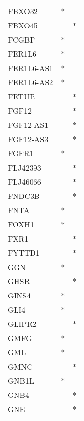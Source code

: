 \begin{longtable}{lcc}
FBXO32           &              * &            \\
FBXO45           &                &          * \\
FCGBP            &              * &            \\
FER1L6           &              * &            \\
FER1L6-AS1       &              * &            \\
FER1L6-AS2       &              * &            \\
FETUB            &                &          * \\
FGF12            &                &          * \\
FGF12-AS1        &                &          * \\
FGF12-AS3        &                &          * \\
FGFR1            &              * &            \\
FLJ42393         &                &          * \\
FLJ46066         &                &          * \\
FNDC3B           &                &          * \\
FNTA             &              * &            \\
FOXH1            &              * &            \\
FXR1             &                &          * \\
FYTTD1           &                &          * \\
GGN              &              * &            \\
GHSR             &                &          * \\
GINS4            &              * &            \\
GLI4             &              * &            \\
GLIPR2           &                &          * \\
GMFG             &              * &            \\
GML              &              * &            \\
GMNC             &                &          * \\
GNB1L            &              * &            \\
GNB4             &                &          * \\
GNE              &                &          * \\

\end{longtable}
